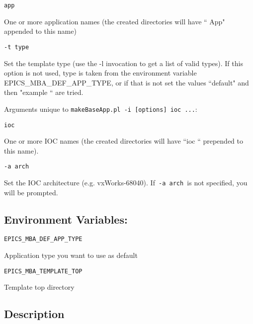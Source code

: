 \begin{verbatim}app     
\end{verbatim}\begin{description}\item One or more application names (the created directories will have `` App" appended to this name)

\end{description}\begin{verbatim}-t type     
\end{verbatim}\begin{description}\item Set the template type (use the -l invocation to get a list of valid types). If this option is not used, type is taken from 
the environment variable EPICS\_MBA\_DEF\_APP\_TYPE, or if that is not set the values ``default" and then 
"example `` are tried.

\end{description}Arguments unique to \verb|makeBaseApp.pl -i [options] ioc ...|:

\begin{verbatim}ioc 
\end{verbatim}One or more IOC names (the created directories will have ``ioc `` prepended to this name).

\begin{verbatim}-a arch     
\end{verbatim}\begin{description}\item Set the IOC architecture (e.g. vxWorks-68040).  If\verb| -a arch |is not specified, you will be prompted.

\end{description}\subsection{Environment Variables:}

\begin{verbatim}EPICS_MBA_DEF_APP_TYPE
\end{verbatim}\begin{description}\item Application type you want to use as default

\end{description}\begin{verbatim}EPICS_MBA_TEMPLATE_TOP
\end{verbatim}\begin{description}\item Template top directory

\end{description}\subsection{Description}

